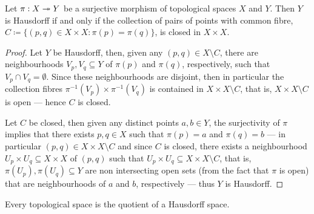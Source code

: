 \begin{proposition}
\label{prop:open-quotient-hausdorff}
Let \(\pi: X \twoheadrightarrow Y\) be a surjective morphism of topological spaces \(X\) and
\(Y\). Then \(Y\) is Hausdorff if and only if the collection of pairs of points
with common fibre,
\(C \coloneqq \{(p, q) \in X \times X \colon \pi(p) = \pi(q)\}\), is closed in
\(X \times X\).
\end{proposition}

\begin{proof}
Let \(Y\) be Hausdorff, then, given any \((p, q) \in X \setminus C\), there are
neighbourhoods \(V_p, V_q \subseteq Y\) of \(\pi(p)\) and \(\pi(q)\),
respectively, such that \(V_p \cap V_q = \emptyset\). Since these neighbourhoods
are disjoint, then in particular the collection fibres \(\pi^{-1}(V_p) \times
\pi^{-1}(V_q)\) is contained in \(X \times X \setminus C\), that is, \(X \times
X \setminus C\) is open --- hence \(C\) is closed.

Let \(C\) be closed, then given any distinct points \(a, b \in Y\), the
surjectivity of \(\pi\) implies that there exists \(p, q \in X\) such that
\(\pi(p) = a\) and \(\pi(q) = b\) --- in particular \((p, q) \in X \times X
\setminus C\) and since \(C\) is closed, there exists a neighbourhood \(U_p
\times U_q \subseteq X \times X\) of \((p, q)\) such that \(U_p \times U_q
\subseteq X \times X \setminus C\), that is, \(\pi(U_p), \pi(U_q) \subseteq Y\)
are non intersecting open sets (from the fact that \(\pi\) is open) that are
neighbourhoods of \(a\) and \(b\), respectively --- thus \(Y\) is Hausdorff.
\end{proof}

\begin{proposition}
\label{prop:top-space-is-quotient-of-hausdorff}
Every topological space is the quotient of a Hausdorff space.
\end{proposition}

